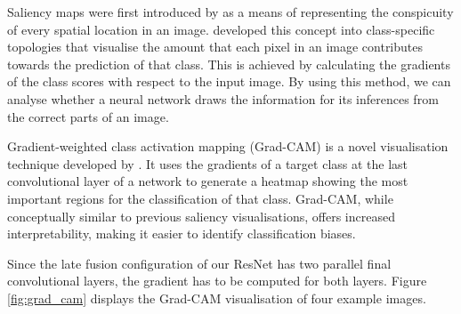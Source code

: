 \documentclass{l4proj}
\begin{document}
Saliency maps were first introduced by \citet{itti_model_1998} as a means of representing the conspicuity of every spatial location in an image. \citet{simonyan_deep_2014} developed this concept into class-specific topologies that visualise the amount that each pixel in an image contributes towards the prediction of that class. This is achieved by calculating the gradients of the class scores with respect to the input image. By using this method, we can analyse whether a neural network draws the information for its inferences from the correct parts of an image.

Gradient-weighted class activation mapping (Grad-CAM) is a novel visualisation technique developed by \citet{selvaraju_grad-cam_2020}. It uses the gradients of a target class at the last convolutional layer of a network to generate a heatmap showing the most important regions for the classification of that class. Grad-CAM, while conceptually similar to previous saliency visualisations, offers increased interpretability, making it easier to identify classification biases.

Since the late fusion configuration of our ResNet has two parallel final convolutional layers, the gradient has to be computed for both layers. Figure \ref{fig:grad_cam} displays the Grad-CAM visualisation of four example images.
\end{document}
